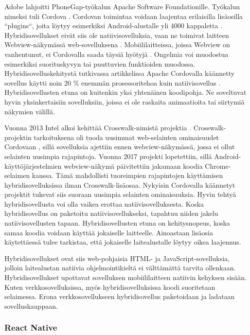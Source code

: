 \documentclass{tktltiki}
\begin{document}
Adobe lahjoitti PhoneGap-työkalun Apache Software Foundationille. Työkalun nimeksi tuli Cordova \cite{Tung}. Cordovan toimintaa voidaan laajentaa erilaisilla lisäosilla “plugins“, joita löytyy esimerkiksi Android-alustalle yli 4000 kappaletta \cite{Cordova}. Hybridisovellukset eivät siis ole natiivisovelluksia, vaan ne toimivat laitteen Webview-näkymässä web-sovelluksena \cite{bosnic2016development}. Mobiililaitteissa, joissa Webview on vanhentunut, ei Cordovalla saada täysiä hyötyjä \cite{bosnic2016development}. Ongelmia voi muodostua esimerkiksi suorituskyvyn tai puuttuvien funktioiden muodossa. Hybridisovelluskehitystä tutkivassa artikkelissa Apache Cordovalla käännetty sovellus käytti noin 20 \% enemmän prosessoritehoa kuin natiivisovellus \cite{bosnic2016development}. Hybridisovellusten etuna on kuitenkin yksi yhtenäinen koodipohja. Ne soveltuvat hyvin yksinkertaisiin sovelluksiin, joissa ei ole raskaita animaatioita tai siirtymiä näkymien välillä. 

Vuonna 2013 Intel alkoi kehittää Crosswalk-nimistä projektia \cite{Crosswalk}. Crosswalk-projektin tarkoituksena oli tuoda uusimmat web-selainten ominaisuudet Cordovaan \cite{bosnic2016development}, sillä sovelluksia ajettiin ennen webview-näkymässä, jossa ei ollut selainten uusimpia rajapintoja. Vuonna 2017 projekti lopetettiin, sillä Android-käyttöjärjestelmien webview-näkymä päivitettiin jakamaan koodia Chrome-selaimen kanssa. Tämä mahdollisti tuoreimpien rajapintojen käyttämisen hybridisovelluksissa ilman Crosswalk-lisäosaa. Nykyisin Cordovalla käännetyt projektit tukevat siis suoraan uusimpia selainten ominaisuuksia. Hyvin tehtyä hybridisovellusta voi olla vaikea erottaa natiivisovelluksesta. Koska hybridisovellus on paketoitu natiivisovellukseksi, tapahtuu niiden jakelu natiivisovellusten tapaan. Hybridisovellusten etuna on kehitysnopeus, koska samaa koodia voidaan käyttää jokaiselle laitteelle. Ainoastaan lisäosia käytettäessä tulee tarkistaa, että jokaiselle laitealustalle löytyy oikea laajennus. 

Hybridisovellukset ovat siis web-pohjaisia HTML- ja JavaScript-sovelluksia, jolloin laitealustan natiivia ohjelmointikieltä ei välttämättä tarvita ollenkaan. Hybridisovellukset upottavat sovelluksen mobiililaitteen natiivin kehyksen sisään. Kuten verkkosovelluksissa, myös hybridisovelluksissa koodi suoritetaan selaimessa. Erona verkkosovellukseen hybridisovellus paketoidaan ja ladataan sovelluskauppaan. 

\subsubsection{React Native}
\end{document}
